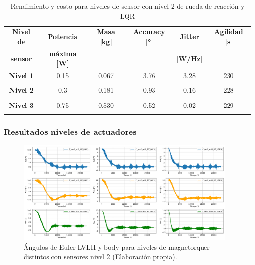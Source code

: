 \begin{table}[h!]
	\centering
	\caption{Rendimiento y costo para niveles de sensor con nivel 2 de rueda de reacción y LQR}
	\begin{tabular}{|c|c|c|c|c|c|}
		\hline
		\textbf{Nivel de}   & \textbf{Potencia} & \textbf{Masa [kg]} & \textbf{Accuracy [°]} & \textbf{Jitter} & \textbf{Agilidad [s]}  \\ 
		\textbf{sensor}  & \textbf{máxima [W]} & & & \textbf{[W/Hz]} &  \\
		\hline
		\textbf{Nivel 1}   & 0.15  & 0.067  & 3.76 & 3.28 & 230  \\
		&  &   &  &  &    \\
		\hline
		\textbf{Nivel 2}   & 0.3  & 0.181  & 0.93 & 0.16 & 228   \\
		& & & & &   \\
		\hline
		\textbf{Nivel 3}   & 0.75  & 0.530  & 0.52 & 0.02 & 229   \\
		& & & & &   \\
		\hline		
	\end{tabular}
	\label{tab:RW_LQR_sensores}
\end{table}

\subsubsection{Resultados niveles de actuadores}


\begin{figure}[H]
	\centering    
	\includegraphics[width=0.97\textwidth]{MT_LQR_actuadores.pdf}
	\caption{Ángulos de Euler LVLH y body para niveles de magnetorquer distintos con sensores nivel 2 (Elaboración propia).}
	\label{fig:MT_LQR_actuadores}
\end{figure}


